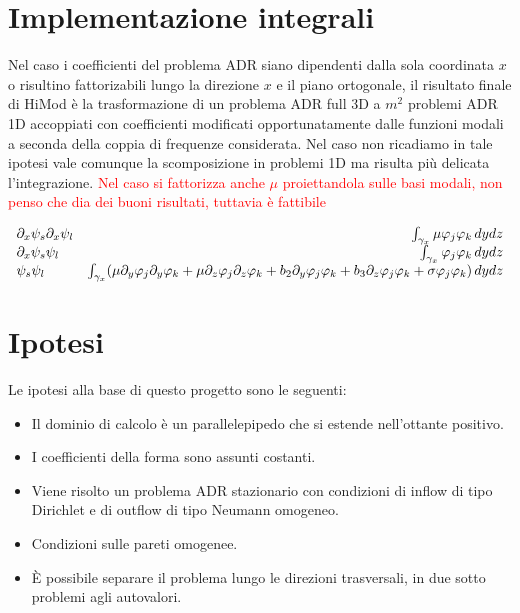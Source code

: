 \section{Implementazione integrali}

Nel caso i coefficienti del problema ADR siano dipendenti dalla sola coordinata $x$ o risultino fattorizabili lungo la direzione $x$ e il piano ortogonale, il risultato finale di HiMod \`e la trasformazione di un problema ADR full 3D a $m^2$ problemi ADR 1D accoppiati con coefficienti modificati opportunatamente dalle funzioni modali a seconda della coppia di frequenze considerata. Nel caso non ricadiamo in tale ipotesi vale comunque la scomposizione in problemi 1D ma risulta pi\`u delicata l'integrazione.
\textcolor{red}{Nel caso si fattorizza anche $\mu$ proiettandola sulle basi modali, non penso che dia dei buoni risultati, tuttavia \`e fattibile}

\begin{equation}
\begin{array}{l r}
\partial_x\psi_s\partial_x\psi_l & \int_{\gamma_x} \mu\varphi_j\varphi_k\,dydz \\
\partial_x\psi_s\psi_l & \int_{\gamma_x}\varphi_j\varphi_k\,dydz\\
\psi_s\psi_l & \int_{\gamma_x}(\mu\partial_y\varphi _j\partial_y\varphi _k + \mu\partial_z\varphi _j\partial_z\varphi _k + b_2\partial_y\varphi_j\varphi_k +b_3\partial_z\varphi_j\varphi_k + \sigma\varphi_j\varphi_k)\,dydz
\end{array}
\end{equation}

\section{Ipotesi}

Le ipotesi alla base di questo progetto sono le seguenti:

\begin{itemize}
\item Il dominio di calcolo \`e un parallelepipedo che si estende nell'ottante positivo.
\item I coefficienti della forma sono assunti costanti.
\item Viene risolto un problema ADR stazionario con condizioni di inflow di tipo Dirichlet e di outflow di tipo Neumann omogeneo.
\item Condizioni sulle pareti omogenee.
\item \`E possibile separare il problema lungo le direzioni trasversali, in due sotto problemi agli autovalori.
\end{itemize}

